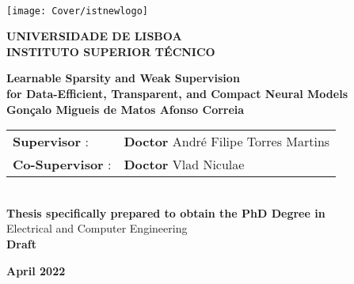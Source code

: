 \setcounter{page}{1} 


\thispagestyle{empty}
\begin{flushleft} ~\\ \vspace{-12mm} \hspace{-12mm}  \texttt{[image: Cover/istnewlogo]}

    \vspace{5mm}
    \centering
    \Large \textbf{UNIVERSIDADE DE LISBOA \\ INSTITUTO SUPERIOR TÉCNICO}
    \vspace{25mm}


    \centering
    \Large \textbf{Learnable Sparsity and Weak Supervision\\for Data-Efficient, Transparent, and Compact Neural Models}
    \\ \vspace{25mm}  %
    \large \textbf{Gonçalo Migueis de Matos Afonso Correia} \\
    \vspace{35mm}

    \begin{minipage}{\textwidth}
        \begin{tabularx}{\textwidth}{ l @{ } l }
            \textbf{Supervisor} :    & \textbf{Doctor} André Filipe Torres Martins \\
            \textbf{Co-Supervisor} : & \textbf{Doctor} Vlad Niculae                \\
        \end{tabularx}
    \end{minipage}
    \\ \vspace{20mm}
    \centering
    \large \textbf{Thesis specifically prepared to obtain the PhD Degree in}\\
    \large Electrical and Computer Engineering\\
    \vspace{18mm}
    \Large \textbf{Draft}

    \vspace{15mm}

    \large \textbf{April 2022} \\
    \let\thepage\relax
\end{flushleft}
\pagebreak
